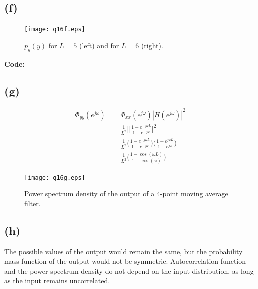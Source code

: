 \documentclass{article}
\begin{document}
\subsection{(f)}

\FloatBarrier
\begin{figure}[ht]
\centering
\texttt{[image: q16f.eps]}
\caption{$p_y(y)$ for $L = 5$ (left) and for $L = 6$ (right).}
\end{figure}
\FloatBarrier

\textbf{Code:}


\subsection{(g)}
\begin{align} \nonumber
\Phi_{yy}(e^{j\omega}) &= \Phi_{xx}(e^{j\omega})|H(e^{j\omega})|^2 \\ \nonumber
& =\frac{1}{L^2}|\bigg|\frac{1-e^{-j\omega L}}{1-e^{-j\omega}}\bigg|^2 \\ \nonumber
& =\frac{1}{L^2}\bigg(\frac{1-e^{-j\omega  L}}{1-e^{-j\omega}}\bigg)\bigg(\frac{1-e^{j\omega L}}{1-e^{j\omega}}\bigg) \\
&= \frac{1}{L^2}\bigg(\frac{1-\cos(\omega L)}{1 - \cos(\omega)}\bigg)
\end{align}

\FloatBarrier
\begin{figure}[ht]
\centering
\texttt{[image: q16g.eps]}
\caption{Power spectrum density of the output of a 4-point moving average filter.}
\label{fig:q16f}
\end{figure}
\FloatBarrier

\subsection{(h)}

The possible values of the output would remain the same, but the probability mass function of the output would not be symmetric. Autocorrelation function and the power spectrum density do not depend on the input distribution, as long as the input remains uncorrelated. 
\end{document}
